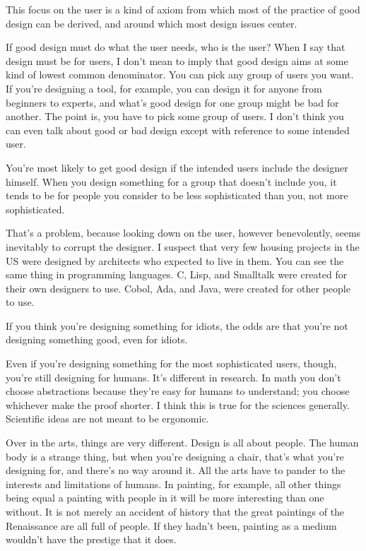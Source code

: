 \documentclass[12pt]{book}
\begin{document}
This focus on the user is a kind of axiom from which most of the
practice of good design can be derived, and around which most design
issues center.

If good design must do what the user needs, who is the user? When I say
that design must be for users, I don't mean to imply that good design
aims at some kind of lowest common denominator. You can pick any group
of users you want. If you're designing a tool, for example, you can
design it for anyone from beginners to experts, and what's good design
for one group might be bad for another. The point is, you have to pick
some group of users. I don't think you can even talk about good or bad
design except with reference to some intended user.

You're most likely to get good design if the intended users include the
designer himself. When you design something for a group that doesn't
include you, it tends to be for people you consider to be less
sophisticated than you, not more sophisticated.

That's a problem, because looking down on the user, however
benevolently, seems inevitably to corrupt the designer. I suspect that
very few housing projects in the US were designed by architects who
expected to live in them. You can see the same thing in programming
languages. C, Lisp, and Smalltalk were created for their own designers
to use. Cobol, Ada, and Java, were created for other people to use.

If you think you're designing something for idiots, the odds are that
you're not designing something good, even for idiots.

Even if you're designing something for the most sophisticated users,
though, you're still designing for humans. It's different in research.
In math you don't choose abstractions because they're easy for humans to
understand; you choose whichever make the proof shorter. I think this is
true for the sciences generally. Scientific ideas are not meant to be
ergonomic.

Over in the arts, things are very different. Design is all about people.
The human body is a strange thing, but when you're designing a chair,
that's what you're designing for, and there's no way around it. All the
arts have to pander to the interests and limitations of humans. In
painting, for example, all other things being equal a painting with
people in it will be more interesting than one without. It is not merely
an accident of history that the great paintings of the Renaissance are
all full of people. If they hadn't been, painting as a medium wouldn't
have the prestige that it does.
\end{document}
